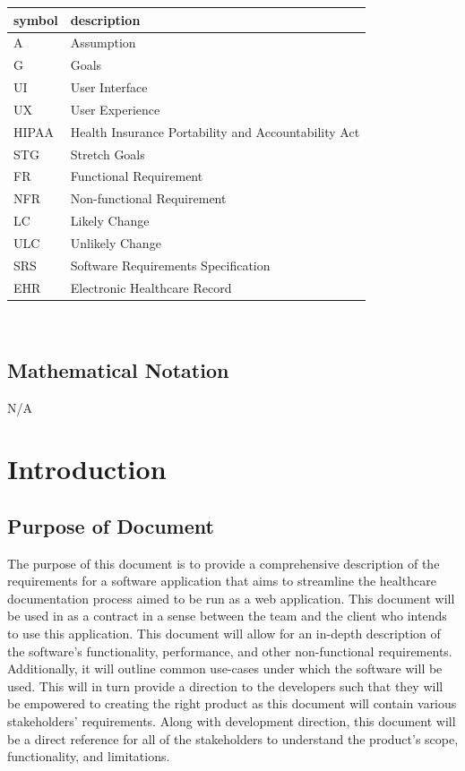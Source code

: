 \documentclass[12pt]{article}
\begin{document}
\begin{tabular}{l l} 
  \toprule    
  \textbf{symbol} & \textbf{description}\\
  \midrule 
  A & Assumption\\
  G & Goals\\
  UI & User Interface\\
  UX & User Experience\\
  HIPAA & Health Insurance Portability and Accountability Act\\
  STG & Stretch Goals\\
  FR & Functional Requirement\\
  NFR & Non-functional Requirement\\
  LC & Likely Change\\
  ULC & Unlikely Change\\
  SRS & Software Requirements Specification\\
  EHR & Electronic Healthcare Record\\
  \bottomrule
\end{tabular}\\

\subsection{Mathematical Notation}
N/A

\newpage



\section{Introduction}

\subsection{Purpose of Document} \label{sec_PurposeOfDocument}

The purpose of this document is to provide a comprehensive description of the requirements for a software application that aims to streamline the healthcare documentation process aimed to be run as a web application. This document will be used in as a contract in a sense between the team and the client who intends to use this application. This document will allow for an in-depth description of the software's functionality, performance, and other non-functional requirements. Additionally, it will outline common use-cases under which the software will be used. This will in turn provide a direction to the developers such that they will be empowered to creating the right product as this document will contain various stakeholders' requirements. Along with development direction, this document will be a direct reference for all of the stakeholders to understand the product's scope, functionality, and limitations.
\end{document}
